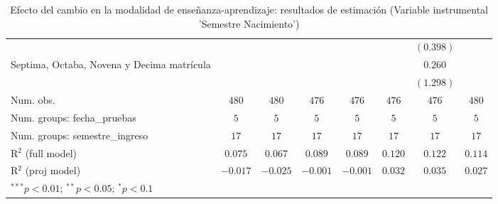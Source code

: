 \begin{table}
\begin{center}
\begin{tabular}{l c c c c c c c}
                                                    &           &           &              &              &             & $(0.398)$    &           \\
Septima, Octaba, Novena y Decima matrícula          &           &           &              &              &             & $0.260$      &           \\
                                                    &           &           &              &              &             & $(1.298)$    &           \\
\hline
Num. obs.                                           & $480$     & $480$     & $476$        & $476$        & $476$       & $476$        & $480$     \\
Num. groups: fecha\_pruebas                         & $5$       & $5$       & $5$          & $5$          & $5$         & $5$          & $5$       \\
Num. groups: semestre\_ingreso                      & $17$      & $17$      & $17$         & $17$         & $17$        & $17$         & $17$      \\
R$^2$ (full model)                                  & $0.075$   & $0.067$   & $0.089$      & $0.089$      & $0.120$     & $0.122$      & $0.114$   \\
R$^2$ (proj model)                                  & $-0.017$  & $-0.025$  & $-0.001$     & $-0.001$     & $0.032$     & $0.035$      & $0.027$   \\
\hline
\multicolumn{8}{l}{\scriptsize{$^{***}p<0.01$; $^{**}p<0.05$; $^{*}p<0.1$}}
\end{tabular}
\caption{Efecto del cambio en la modalidad de enseñanza-aprendizaje: resultados de estimación (Variable instrumental 'Semestre Nacimiento')}
\label{tab:regresiones_efectos_fijos_IV}
\end{center}
\end{table}
